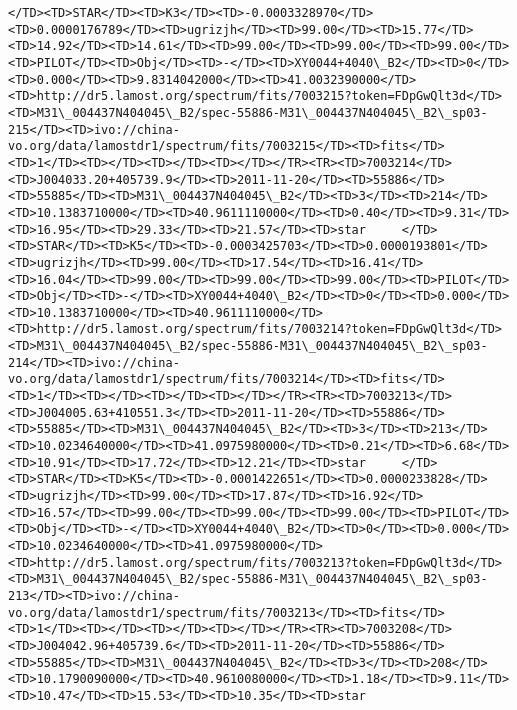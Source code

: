 \documentclass[11pt]{article}
\begin{document}
\begin{Verbatim}[commandchars=\\\{\}]
</TD><TD>STAR</TD><TD>K3</TD><TD>-0.0003328970</TD><TD>0.0000176789</TD><TD>ugrizjh</TD><TD>99.00</TD><TD>15.77</TD><TD>14.92</TD><TD>14.61</TD><TD>99.00</TD><TD>99.00</TD><TD>99.00</TD><TD>PILOT</TD><TD>Obj</TD><TD>-</TD><TD>XY0044+4040\_B2</TD><TD>0</TD><TD>0.000</TD><TD>9.8314042000</TD><TD>41.0032390000</TD><TD>http://dr5.lamost.org/spectrum/fits/7003215?token=FDpGwQlt3d</TD><TD>M31\_004437N404045\_B2/spec-55886-M31\_004437N404045\_B2\_sp03-215</TD><TD>ivo://china-vo.org/data/lamostdr1/spectrum/fits/7003215</TD><TD>fits</TD><TD>1</TD><TD></TD><TD></TD><TD></TD></TR><TR><TD>7003214</TD><TD>J004033.20+405739.9</TD><TD>2011-11-20</TD><TD>55886</TD><TD>55885</TD><TD>M31\_004437N404045\_B2</TD><TD>3</TD><TD>214</TD><TD>10.1383710000</TD><TD>40.9611110000</TD><TD>0.40</TD><TD>9.31</TD><TD>16.95</TD><TD>29.33</TD><TD>21.57</TD><TD>star     </TD><TD>STAR</TD><TD>K5</TD><TD>-0.0003425703</TD><TD>0.0000193801</TD><TD>ugrizjh</TD><TD>99.00</TD><TD>17.54</TD><TD>16.41</TD><TD>16.04</TD><TD>99.00</TD><TD>99.00</TD><TD>99.00</TD><TD>PILOT</TD><TD>Obj</TD><TD>-</TD><TD>XY0044+4040\_B2</TD><TD>0</TD><TD>0.000</TD><TD>10.1383710000</TD><TD>40.9611110000</TD><TD>http://dr5.lamost.org/spectrum/fits/7003214?token=FDpGwQlt3d</TD><TD>M31\_004437N404045\_B2/spec-55886-M31\_004437N404045\_B2\_sp03-214</TD><TD>ivo://china-vo.org/data/lamostdr1/spectrum/fits/7003214</TD><TD>fits</TD><TD>1</TD><TD></TD><TD></TD><TD></TD></TR><TR><TD>7003213</TD><TD>J004005.63+410551.3</TD><TD>2011-11-20</TD><TD>55886</TD><TD>55885</TD><TD>M31\_004437N404045\_B2</TD><TD>3</TD><TD>213</TD><TD>10.0234640000</TD><TD>41.0975980000</TD><TD>0.21</TD><TD>6.68</TD><TD>10.91</TD><TD>17.72</TD><TD>12.21</TD><TD>star     </TD><TD>STAR</TD><TD>K5</TD><TD>-0.0001422651</TD><TD>0.0000233828</TD><TD>ugrizjh</TD><TD>99.00</TD><TD>17.87</TD><TD>16.92</TD><TD>16.57</TD><TD>99.00</TD><TD>99.00</TD><TD>99.00</TD><TD>PILOT</TD><TD>Obj</TD><TD>-</TD><TD>XY0044+4040\_B2</TD><TD>0</TD><TD>0.000</TD><TD>10.0234640000</TD><TD>41.0975980000</TD><TD>http://dr5.lamost.org/spectrum/fits/7003213?token=FDpGwQlt3d</TD><TD>M31\_004437N404045\_B2/spec-55886-M31\_004437N404045\_B2\_sp03-213</TD><TD>ivo://china-vo.org/data/lamostdr1/spectrum/fits/7003213</TD><TD>fits</TD><TD>1</TD><TD></TD><TD></TD><TD></TD></TR><TR><TD>7003208</TD><TD>J004042.96+405739.6</TD><TD>2011-11-20</TD><TD>55886</TD><TD>55885</TD><TD>M31\_004437N404045\_B2</TD><TD>3</TD><TD>208</TD><TD>10.1790090000</TD><TD>40.9610080000</TD><TD>1.18</TD><TD>9.11</TD><TD>10.47</TD><TD>15.53</TD><TD>10.35</TD><TD>star     
\end{Verbatim}
\end{document}
